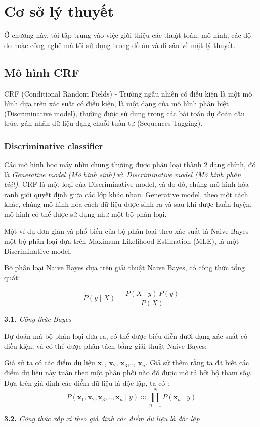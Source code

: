 \setcounter{chapter}{2}
\chapter{Cơ sở lý thuyết}

Ở chương này, tôi tập trung vào việc giới thiệu các thuật toán, mô hình, các độ đo hoặc công nghệ mà tôi sử dụng trong đồ án và đi sâu về mặt lý thuyết.
\section{Mô hình CRF}
CRF (Conditional Random Fields) - Trường ngẫu nhiên có điều kiện là một mô hình dựa trên xác suất có điều kiện, là một dạng của mô hình phân biệt (Discriminative model), thường được sử dụng trong các bài toán dự đoán cấu trúc, gán nhãn dữ liệu dạng chuỗi tuần tự (Sequences Tagging).
\subsection{Discriminative classifier}
Các mô hình học máy nhìn chung thường được phận loại thành 2 dạng chính, đó là \textit{Generative model (Mô hình sinh)} và \textit{Discriminative model (Mô hình phân biệt)}. CRF là một loại của Discriminative model, và do đó, chúng mô hình hóa ranh giới quyết định giữa các lớp khác nhau. Generative model, theo một cách khác, chúng mô hình hóa cách dữ liệu được sinh ra và sau khi được huấn luyện, mô hình có thể được sử dụng như một bộ phân loại.

Một ví dụ đơn giản và phổ biến của bộ phân loại theo xác suất là Naive Bayes - một bộ phân loại dựa trên Maximum Likelihood Estimation (MLE), là một Discriminative model.

Bộ phân loại Naive Bayes dựa trên giải thuật Naive Bayes, có công thức tổng quát:

$$ P(y \mid X) = \frac{P(X \mid y) \, P(y)}{P(X)} $$
\begin{center}

\vspace{0.3cm}
\textbf{3.1.} \textit{Công thức Bayes}    
\end{center}

Dự đoán mà bộ phân loại đưa ra, có thể được biểu diễn dưới dạng xác suất có điều kiện, và có thể được phân tách bằng giải thuật Naive Bayes:

Giả sử ta có các điểm dữ liệu ${\textbf{x}_1}$, ${\textbf{x}_2}$, ${\textbf{x}_3}$,.., ${\textbf{x}_n}$. Giả sử thêm rằng ta đã biết các điểm dữ liệu này tuân theo một phân phối nào đó được mô tả bởi bộ tham số\textit{y}.
Dựa trên giả định các điểm dữ liệu là độc lập, ta có :
$$ P({\textbf{x}_1}, {\textbf{x}_2}, {\textbf{x}_3},.., {\textbf{x}_n} \mid y) \approx \prod_{n=1}^{N} P({\textbf{x}_n} \mid y)$$
\begin{center}

\vspace{0.3cm}
\textbf{3.2.} \textit{Công thức xấp xỉ theo giả định các điểm dữ liệu là độc lập }       
\end{center}

